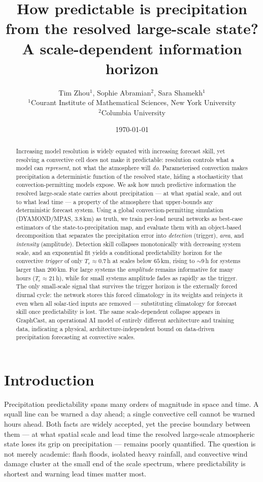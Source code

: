 \documentclass[11pt]{article}
\title{\sffamily\bfseries How predictable is precipitation from the resolved
large-scale state?\\[4pt]
{\large\mdseries A scale-dependent information horizon}}
\author{
Tim Zhou$^{1}$, \quad Sophie Abramian$^{2}$, \quad Sara Shamekh$^{1}$ \\[5pt]
\small $^{1}$Courant Institute of Mathematical Sciences, New York University \\
\small $^{2}$Columbia University
}
\date{\today}
\begin{document}
\maketitle

\begin{abstract}
\noindent
Increasing model resolution is widely equated with increasing forecast skill,
yet resolving a convective cell does not make it predictable: resolution
controls what a model can \emph{represent}, not what the atmosphere will
\emph{do}. Parameterised convection makes precipitation a deterministic
function of the resolved state, hiding a stochasticity that
convection-permitting models expose. We ask how much predictive information the resolved large-scale state carries
about precipitation --- at what spatial scale, and out to what lead time ---
a property of the atmosphere that upper-bounds any deterministic forecast system. Using a global convection-permitting
simulation (DYAMOND/MPAS, $3.8$\,km) as truth, we train per-lead neural
networks as best-case estimators of the state-to-precipitation map, and
evaluate them with an object-based decomposition that separates the
precipitation error into \emph{detection} (trigger), \emph{area}, and
\emph{intensity} (amplitude). Detection skill collapses monotonically with
decreasing system scale, and an exponential fit yields a conditional
predictability horizon for the convective \emph{trigger} of only
$T_e\!\approx\!0.7$\,h at scales below $65$\,km, rising to $\sim$9\,h for
systems larger than $200$\,km. For large systems the \emph{amplitude} remains
informative for many hours ($T_e\!\approx\!21$\,h), while for small systems
amplitude fades as rapidly as the trigger. The only small-scale signal that
survives the trigger horizon is the externally forced diurnal cycle: the
network stores this forced climatology in its weights and reinjects it even
when all solar-tied inputs are removed --- substituting climatology for
forecast skill once predictability is lost. The same scale-dependent collapse
appears in GraphCast, an operational AI model of entirely different
architecture and training data, indicating a physical, architecture-independent
bound on data-driven precipitation forecasting at convective scales.
\end{abstract}

\section{Introduction}

Precipitation predictability spans many orders of magnitude in space and time.
A squall line can be warned a day ahead; a single convective cell cannot be
warned hours ahead. Both facts are widely accepted, yet the precise boundary
between them --- at what spatial scale and lead time the resolved large-scale
atmospheric state loses its grip on precipitation --- remains poorly quantified.
The question is not merely academic: flash floods, isolated heavy rainfall, and
convective wind damage cluster at the small end of the scale spectrum, where
predictability is shortest and warning lead times matter most.
\end{document}
